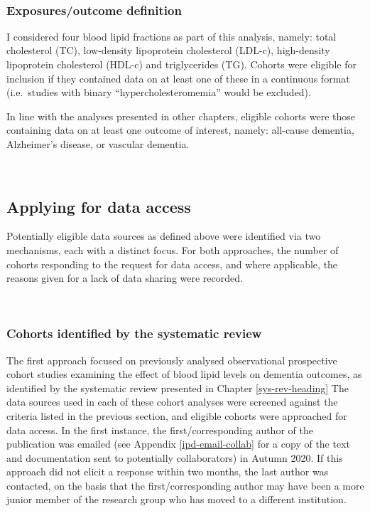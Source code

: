 \documentclass[a4paper, twoside]{templates/ociamthesis}
\begin{document}
~

\hypertarget{exposuresoutcome-definition}{%
\subsubsection{Exposures/outcome definition}\label{exposuresoutcome-definition}}

I considered four blood lipid fractions as part of this analysis, namely: total cholesterol (TC), low-density lipoprotein cholesterol (LDL-c), high-density lipoprotein cholesterol (HDL-c) and triglycerides (TG). Cohorts were eligible for inclusion if they contained data on at least one of these in a continuous format (i.e.~studies with binary ``hypercholesteromemia'' would be excluded).

In line with the analyses presented in other chapters, eligible cohorts were those containing data on at least one outcome of interest, namely: all-cause dementia, Alzheimer's disease, or vascular dementia.

~

\hypertarget{applying-for-data-access}{%
\subsection{Applying for data access}\label{applying-for-data-access}}

Potentially eligible data sources as defined above were identified via two mechanisms, each with a distinct focus. For both approaches, the number of cohorts responding to the request for data access, and where applicable, the reasons given for a lack of data sharing were recorded.

~

\hypertarget{cohorts-identified-by-the-systematic-review}{%
\subsubsection{Cohorts identified by the systematic review}\label{cohorts-identified-by-the-systematic-review}}

The first approach focused on previously analysed observational prospective cohort studies examining the effect of blood lipid levels on dementia outcomes, as identified by the systematic review presented in Chapter \ref{sys-rev-heading} The data sources used in each of these cohort analyses were screened against the criteria listed in the previous section, and eligible cohorts were approached for data access. In the first instance, the first/corresponding author of the publication was emailed (see Appendix \ref{ipd-email-collab} for a copy of the text and documentation sent to potentially collaborators) in Autumn 2020. If this approach did not elicit a response within two months, the last author was contacted, on the basis that the first/corresponding author may have been a more junior member of the research group who has moved to a different institution.
\end{document}
